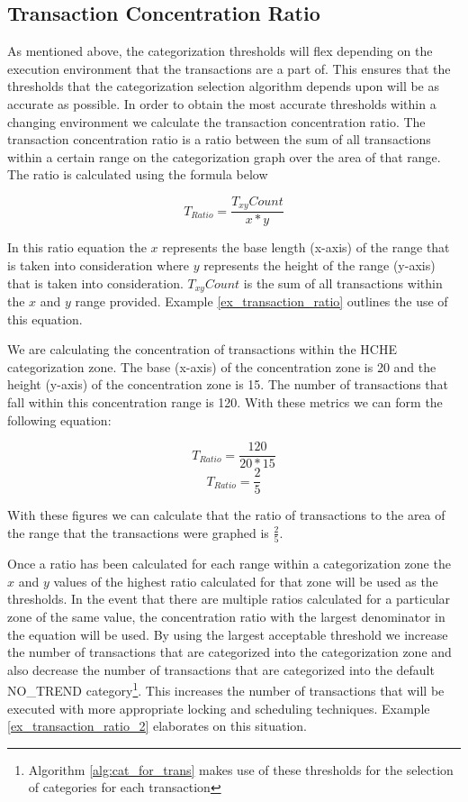 \subsection{Transaction Concentration Ratio}
\label{sec:TCR}

As mentioned above, the categorization thresholds will flex depending on the execution environment that the transactions are a part of. This ensures that the thresholds that the categorization selection algorithm depends upon will be as accurate as possible. In order to obtain the most accurate thresholds within a changing environment we calculate the transaction concentration ratio. The transaction concentration ratio is a ratio between the sum of all transactions within a certain range on the categorization graph over the area of that range. The ratio is calculated using the formula below

\[\textrm{$T_{Ratio}$} =\frac{\textrm{$T_{xy}{Count}$}}{x * y}\]

In this ratio equation the $x$ represents the base length (x-axis) of the range that is taken into consideration where $y$ represents the height of the range (y-axis) that is taken into consideration. $T_{xy}{Count}$ is the sum of all transactions within the $x$ and $y$ range provided. Example \ref{ex_transaction_ratio} outlines the use of this equation.

 \begin{example}
 \label{ex_transaction_ratio}
  We are calculating the concentration of transactions within the HCHE categorization zone. The base (x-axis) of the concentration zone is 20 and the height (y-axis) of the concentration zone is 15. The number of transactions that fall within this concentration range is 120. With these metrics we can form the following equation:
  
  \[\textrm{$T_{Ratio}$} =\frac{\textrm{120}}{20 * 15}\]
  \[\textrm{$T_{Ratio}$} =\frac{\textrm{2}}{5}\]
  
  With these figures we can calculate that the ratio of transactions to the area of the range that the transactions were graphed is \( \frac{2}{5} \).
  
 \end{example}
 
Once a ratio has been calculated for each range within a categorization zone the $x$ and $y$ values of the highest ratio calculated for that zone will be used as the thresholds. In the event that there are multiple ratios calculated for a particular zone of the same value, the concentration ratio with the largest denominator in the equation will be used. By using the largest acceptable threshold we increase the number of transactions that are categorized into the categorization zone and also decrease the number of transactions that are categorized into the default NO\_TREND category\footnote{Algorithm \ref{alg:cat_for_trans} makes use of these thresholds for the selection of categories for each transaction}. This increases the number of transactions that will be executed with more appropriate locking and scheduling techniques. Example \ref{ex_transaction_ratio_2} elaborates on this situation.

